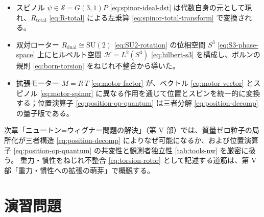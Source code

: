 \documentclass[dvipdfmx,a4paper,oneside]{jsbook}
\numberwithin{equation}{chapter}
\begin{document}
\begin{itemize}[leftmargin=2em]
  \item スピノル \(\psi \in \mathcal{S} = G(3,1)P\) \eqref{eq:spinor-ideal-dst} は代数自身の元として現れ、\(R_{\mathrm{total}}\) \eqref{eq:R-total} による左乗算 \eqref{eq:spinor-total-transform} で変換される。
  \item 双対ローター \(R_{\mathrm{dual}} \cong \mathrm{SU}(2)\) \eqref{eq:SU2-rotation} の位相空間 \(S^3\) \eqref{eq:S3-phase-space} 上にヒルベルト空間 \(\mathcal{H} = L^2(S^3)\) \eqref{eq:hilbert-s3} を構成し、ボルンの規則 \eqref{eq:born-torsion} をねじれ不整合から導いた。
  \item 拡張モーター \(M = R\,T\) \eqref{eq:motor-factor} が、ベクトル \eqref{eq:motor-vector} とスピノル \eqref{eq:motor-spinor} に異なる作用を通じて位置とスピンを統一的に変換する；位置演算子 \eqref{eq:position-op-quantum} は三者分解 \eqref{eq:position-decomp} の量子版である。
\end{itemize}

次章「ニュートン=ウィグナー問題の解決」（第 V 部）では、質量ゼロ粒子の局所化が三者構造 \eqref{eq:position-decomp} によりなぜ可能になるか、および位置演算子 \eqref{eq:position-op-quantum} の共変性と観測者独立性 \eqref{tab:tools-nw} を厳密に扱う。
重力・慣性をねじれ不整合 \eqref{eq:torsion-rotor} として記述する道筋は、第 V 部「重力・慣性への拡張の萌芽」で概観する。

\section*{演習問題}
\end{document}
